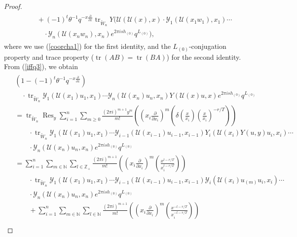 \documentclass[9pt]{amsart}
\newcommand{\Y}{\mathcal{Y}}
\newcommand{\Res}{\operatorname{Res}}
\begin{document}
\begin{proof}
\begin{align}
\begin{split}
&\quad + (-1)^{t} \theta^{-1} q^{-x \frac{\partial}{\partial x}} 
\operatorname{tr}_{\tilde{W}_n} Y\big( \mathcal{U}(\mathcal{U}(x),x) \cdot 
\mathcal{Y}_1(\mathcal{U}(x_1 w_1),x_1) \cdots \\
&\qquad \cdot \mathcal{Y}_n(\mathcal{U}(x_n w_n),x_n)
e^{2\pi i s h_{(0)}} q^{L_{(0)}} \big),
\end{split}
\end{align}
where we use (\ref{coorcha1}) for the first identity, and the $L_{(0)}$-conjugation property and trace property ($\operatorname{tr}(AB) = \operatorname{tr}(BA)$) for the second identity. From (\ref{iffq3}), we obtain
\begin{align}\label{iffq4}
\begin{split}
  &(1 - (-1)^t \theta^{-1} q^{-x\frac{\partial}{\partial x}}) \\
  &\quad \cdot \operatorname{tr}_{\tilde{W}_n}
    \Y_1(\mathcal{U}(x_1)u_1,x_1) \cdots \Y_n(\mathcal{U}(x_n)u_n,x_n)
    Y(\mathcal{U}(x)u,x) e^{2\pi i s h_{(0)}} q^{L_{(0)}} \\
  &=
    \operatorname{tr}_{\tilde{W}_n}
    \Res_{y} \sum_{i=1}^{n} \sum_{m \geq 0}
    \frac{(2\pi i)^{m+1} y^m}{m!}
    \left( \left( x_i \frac{\partial}{\partial x_i} \right)^m
    \left( \delta\left( \frac{x}{x_i} \right)
    \left( \frac{x}{x_i} \right)^{-r/T} \right) \right) \\
  &\quad\quad\cdot
    \operatorname{tr}_{\tilde{W}_n}
    \Y_1(\mathcal{U}(x_1)u_1,x_1) \cdots
    \Y_{i-1}(\mathcal{U}(x_{i-1})u_{i-1},x_{i-1})
    Y_i(\mathcal{U}(x_i)Y(u,y)u_i,x_i) \cdots \\
  &\quad\quad\cdot
    \Y_n(\mathcal{U}(x_n)u_n,x_n) e^{2\pi i s h_{(0)}} q^{L_{(0)}} \\
  &=
    \sum_{i=1}^n \sum_{m \in \mathbb{N}} \sum_{l \in \mathbb{Z}_+}
    \frac{(2\pi i)^{m+1}}{m!}
    \left( \left( x_i \frac{\partial}{\partial x_i} \right)^m
    \left( \frac{x^{l - r/T}}{x_i^{l - r/T}} \right) \right) \\
  &\quad\quad\cdot
    \operatorname{tr}_{\tilde{W}_n}
    \Y_1(\mathcal{U}(x_1)u_1,x_1) \cdots
    \Y_{i-1}(\mathcal{U}(x_{i-1})u_{i-1},x_{i-1})
    \Y_i(\mathcal{U}(x_i)u_{(m)}u_i,x_i) \cdots \\
  &\quad\quad\cdot
    \Y_n(\mathcal{U}(x_n)u_n,x_n) e^{2\pi i s h_{(0)}} q^{L_{(0)}} \\
  &\quad\quad
    + \sum_{i=1}^n \sum_{m \in \mathbb{N}} \sum_{l \in \mathbb{N}}
    \frac{(2\pi i)^{m+1}}{m!}
    \left( \left( x_i \frac{\partial}{\partial x_i} \right)^m
    \left( \frac{x^{-l - r/T}}{x_i^{-l - r/T}} \right) \right) \\

\end{split}
\end{align}
\end{proof}
\end{document}
